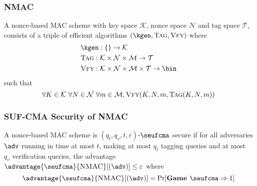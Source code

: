 \documentclass[11pt,a4paper]{article}
\renewcommand{\verify}{\textsc{Vfy}}
\newcommand{\Tag}{\textsc{Tag}}
\begin{document}
\subsubsection{NMAC}
A nonce-based MAC scheme with key space $\mathcal{K}$, nonce space $\mathcal{N}$ and tag space $\mathcal{T}$, consists of a triple of efficient algorithms $(\kgen, \Tag, \verify)$ where 
$$
\begin{aligned}
&\kgen: \{\} \rightarrow \mathcal{K} \\
&\Tag: \mathcal{K} \times \mathcal{N} \times \mathcal{M} \rightarrow \mathcal{T} \\
&\verify: \mathcal{K} \times \mathcal{N} \times \mathcal{M} \times \mathcal{T} \rightarrow \bin \\ 
\end{aligned}
$$
such that
$$
\forall K \in \mathcal{K} \ \forall N \in \mathcal{N} \ \forall m \in \mathcal{M}, \verify(K,N,m, \Tag(K, N, m))
$$

\subsubsection{SUF-CMA Security of NMAC}
A nonce-based MAC scheme is $(q_t, q_v, t, \varepsilon)$-$\seufcma$ secure if for all adversaries $\adv$ running in time at most $t$, making at most $q_t$ tagging queries and at most $q_v$ verification queries, the advantage $\advantage{\seufcma}{\textsc{NMAC}}[(\adv)] \leq \varepsilon$ where 
$$
\advantage{\seufcma}{\textsc{NMAC}}[(\adv)] = \Pr[\textbf{Game } \seufcma \Rightarrow 1]
$$
\end{document}
